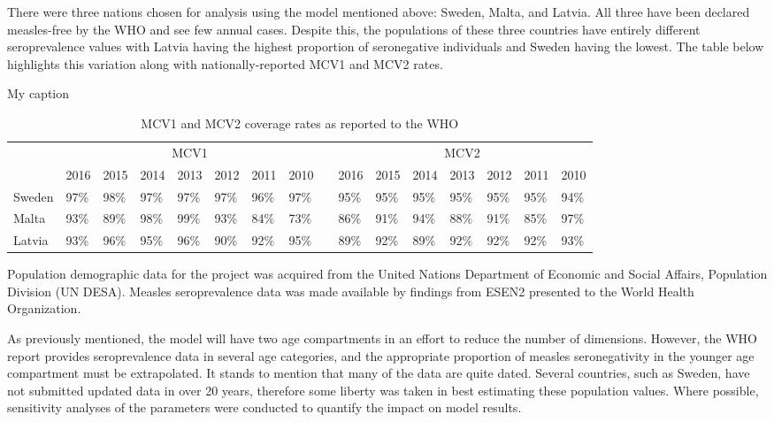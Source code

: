 \documentclass[../Paper.tex]{subfiles}
\begin{document}
\justifying
There were three nations chosen for analysis using the model mentioned above:
Sweden, Malta, and Latvia. All three have been declared measles-free by the WHO
and see few annual cases. Despite this, the populations of these three countries
have entirely different seroprevalence values with Latvia having the highest
proportion of seronegative individuals and Sweden having the lowest.
The table below highlights this variation along with nationally-reported MCV1 and MCV2 rates.
\begin{table}[htbp]
\centering
\caption{My caption}
\label{my-label}
\begin{tabular}{@{}lllllllllllllllll@{}}
\toprule
\multicolumn{2}{l}{\multirow{2}{*}{}} & \multicolumn{7}{c}{MCV1} &  & \multicolumn{7}{c}{MCV2} \\ \cmidrule(l){3-17}
\multicolumn{2}{l}{} & 2016 & 2015 & 2014 & 2013 & 2012 & 2011 & 2010 &  & 2016 & 2015 & 2014 & 2013 & 2012 & 2011 & 2010 \\ \cmidrule(r){1-2}
\multicolumn{2}{l}{Sweden} & 97\% & 98\% & 97\% & 97\% & 97\% & 96\% & 97\% &  & 95\% & 95\% & 95\% & 95\% & 95\% & 95\% & 94\% \\
\multicolumn{2}{l}{Malta} & 93\% & 89\% & 98\% & 99\% & 93\% & 84\% & 73\% &  & 86\% & 91\% & 94\% & 88\% & 91\% & 85\% & 97\% \\
\multicolumn{2}{l}{Latvia} & 93\% & 96\% & 95\% & 96\% & 90\% & 92\% & 95\% &  & 89\% & 92\% & 89\% & 92\% & 92\% & 92\% & 93\% \\ \bottomrule
\end{tabular}
\caption{MCV1 and MCV2 coverage rates as reported to the WHO \cite{http://www.who.int/immunization/monitoring_surveillance/routine/reporting/en/}}
\end{table}


Population demographic data for the project was acquired from the United Nations
Department of Economic and Social Affairs, Population Division (UN DESA). Measles
seroprevalence data was made available by findings from ESEN2 presented to the World
Health Organization.

As previously mentioned, the model will have two age compartments in an effort to
reduce the number of dimensions. However, the WHO report provides seroprevalence data
in several age categories, and the appropriate proportion of measles seronegativity
in the younger age compartment must be extrapolated. It stands to mention that
many of the data are quite dated.
Several countries, such as Sweden, have not submitted updated data in over 20 years,
therefore some liberty was taken in best estimating these population values.
Where possible, sensitivity analyses of the parameters were conducted to
quantify the impact on model results.
\end{document}
